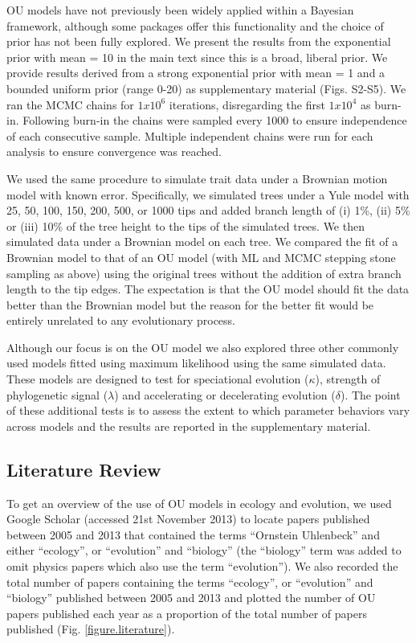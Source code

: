 \documentclass[a4paper,12pt]{article}
\begin{document}
OU models have not previously been widely applied within a Bayesian framework, although some packages offer this functionality \citep[e.g., diversitree;][]{FitzJohn:2012aa} and the choice of prior has not been fully explored. We present the results from the exponential prior with mean = 10 in the main text since this is a broad, liberal prior. We provide results derived from a strong exponential prior with mean = 1 and a bounded uniform prior (range 0-20) as supplementary material (Figs. S2-S5). We ran the MCMC chains for $1x10^6$ iterations, disregarding the first $1x10^4$ as burn-in. Following burn-in the chains were sampled every 1000 to ensure independence of each consecutive sample. Multiple independent chains were run for each analysis to ensure convergence was reached. 

We used the same procedure to simulate trait data under a Brownian motion model with known error. Specifically, we simulated trees under a Yule model with 25, 50, 100, 150, 200, 500, or 1000 tips and added branch length of (i) 1\%, (ii) 5\% or (iii) 10\% of the tree height to the tips of the simulated trees. We then simulated data under a Brownian model on each tree. We compared the fit of a Brownian model to that of an OU model (with ML and MCMC stepping stone sampling as above) using the original trees without the addition of extra branch length to the tip edges. The expectation is that the OU model should fit the data better than the Brownian model but the reason for the better fit would be entirely unrelated to any evolutionary process. 

Although our focus is on the OU model we also explored three other commonly used models \citep[$\kappa$, $\lambda$, and $\delta$;][]{Pagel:1997aa,Pagel:1999aa} fitted using maximum likelihood using the same simulated data. These models are designed to test for speciational evolution ($\kappa$), strength of phylogenetic signal ($\lambda$) and accelerating or decelerating evolution ($\delta$). The point of these additional tests is to assess the extent to which parameter behaviors vary across models and the results are reported in the supplementary material. 

\subsection{Literature Review}
\label{section:literature.methods} 
To get an overview of the use of OU models in ecology and evolution, we used Google Scholar (accessed 21st November 2013) to locate papers published between 2005 \citep[when the R package ouch was released;][]{Butler:2004aa} and 2013 that contained the terms “Ornstein Uhlenbeck” and either “ecology”, or “evolution” and “biology” (the “biology” term was added to omit physics papers which also use the term “evolution”). We also recorded the total number of papers containing the terms “ecology”, or “evolution” and “biology” published between 2005 and 2013 and plotted the number of OU papers published each year as a proportion of the total number of papers published (Fig. \ref{figure.literature}).
\end{document}
